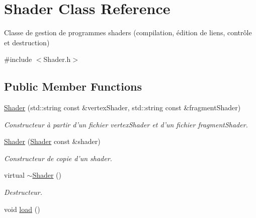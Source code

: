\hypertarget{classShader}{\section{Shader Class Reference}
\label{classShader}
}


Classe de gestion de programmes shaders (compilation, édition de liens, contrôle et destruction)  




{\ttfamily \#include $<$Shader.\-h$>$}

\subsection*{Public Member Functions}
\begin{DoxyCompactItemize}
\item 
\hypertarget{classShader_a85497d4a14f30f3518cf096a19ffdfa9}{\hyperlink{classShader_a85497d4a14f30f3518cf096a19ffdfa9}{Shader} (std\-::string const \&vertex\-Shader, std\-::string const \&fragment\-Shader)}\label{classShader_a85497d4a14f30f3518cf096a19ffdfa9}

\begin{DoxyCompactList}\small\item\em Constructeur à partir d'un fichier vertex\-Shader et d'un fichier fragment\-Shader. \end{DoxyCompactList}\item 
\hypertarget{classShader_ac25dbd32c17223c50e045ddbf060f5c1}{\hyperlink{classShader_ac25dbd32c17223c50e045ddbf060f5c1}{Shader} (\hyperlink{classShader}{Shader} const \&shader)}\label{classShader_ac25dbd32c17223c50e045ddbf060f5c1}

\begin{DoxyCompactList}\small\item\em Constructeur de copie d'un shader. \end{DoxyCompactList}\item 
\hypertarget{classShader_aff01df87e8a102f270b5b135a295e59d}{virtual \hyperlink{classShader_aff01df87e8a102f270b5b135a295e59d}{$\sim$\-Shader} ()}\label{classShader_aff01df87e8a102f270b5b135a295e59d}

\begin{DoxyCompactList}\small\item\em Destructeur. \end{DoxyCompactList}\item 
\hypertarget{classShader_a4222b925de192c794cdef621b13a5914}{void \hyperlink{classShader_a4222b925de192c794cdef621b13a5914}{load} ()}\label{classShader_a4222b925de192c794cdef621b13a5914}


\end{DoxyCompactItemize}
